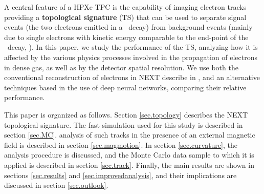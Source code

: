 \documentclass[a4paper,11pt]{article}
\begin{document}
A central feature of a HPXe TPC is the capability of imaging electron tracks providing a {\bf topological signature} (TS)  that can be used to separate signal events (the two electrons emitted in a \bbonu\ decay) from background events (mainly due to single electrons with kinetic energy comparable to the end-point of the \bbonu\ decay, \Qbb). In this paper, we study the performance of the TS, analyzing how it is affected by the various physics processes involved in the propagation of electrons in dense gas, as well as by the detector spatial resolution. We use both the conventional reconstruction of electrons in NEXT describe in \cite{NEXT_topology}, and an alternative techniques based in the use of deep neural networks, comparing their relative performance. 

This paper is organized as follows.  Section \ref{sec.topology} describes the NEXT topological signature. The fast simulation used for this study is described in section \ref{sec.MC}. analysis of such tracks in the presence of an external magnetic field is described in section \ref{sec.magmotion}.  In section \ref{sec.curvature}, the analysis procedure is discussed, and the Monte Carlo data sample to which it is applied is described in section \ref{sec.track}.  Finally, the main results are shown in sections \ref{sec.results} and \ref{sec.improvedanalysis}, and their implications are discussed in section \ref{sec.outlook}.
\end{document}
